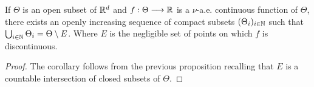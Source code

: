 \begin{cor}
    If $\Theta$ is an open subset of $\mathbb{R}^d$ and $f:\Theta\longrightarrow\mathbb{R}$ is a $\nu$-a.e. continuous function of $\Theta$, there exists an openly increasing sequence of compact subsets $(\Theta_i)_{i\in\mathbb{N}}$  such that $\bigcup_{i\in\mathbb{N}}\Theta_i = \Theta\setminus E$. Where $E$ is the negligible set of points on which $f$ is discontinuous.
\end{cor}

\begin{proof}
    The corollary follows from the previous proposition recalling that $E$ is a countable intersection of closed subsets of $\Theta$.
\end{proof}









